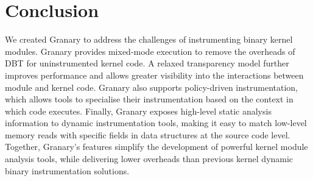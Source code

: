 \documentclass[preprint]{sigplanconf}
\begin{document}
\section{Conclusion}\label{sec:conclusion}
We created Granary to address the challenges of instrumenting binary kernel modules.  Granary provides mixed-mode execution to remove the overheads of DBT for uninstrumented kernel code.  A relaxed transparency model further improves performance and allows greater visibility into the interactions between module and kernel code.  Granary also supports policy-driven instrumentation, which allows tools to specialise their instrumentation based on the context in which code executes.  Finally, Granary exposes high-level static analysis information to dynamic instrumentation tools, making it easy to match low-level memory reads with specific fields in data structures at the source code level. 
Together, Granary's features simplify the development of powerful kernel module analysis tools, while delivering lower overheads than previous kernel dynamic binary instrumentation solutions.






\end{document}
